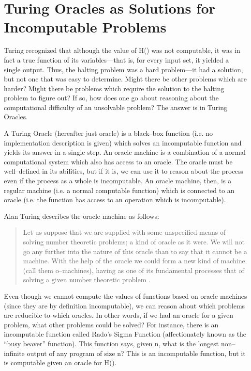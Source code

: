 \section[Turing Oracles as Solutions]{Turing Oracles as Solutions for Incomputable Problems}

Turing recognized that although the value of H() was not computable, it was in fact a true function of its variables---that is, for every input set, it yielded a single output.  Thus, the halting problem was a hard problem---it had a solution, but not one that was easy to determine.  Might there be other problems which are harder?  Might there be problems which require the solution to the halting problem to figure out?  If so, how does one go about reasoning about the computational difficulty of an unsolvable problem?  The answer is in Turing Oracles.  

A Turing Oracle (hereafter just oracle) is a black--box function (i.e. no implementation description is given) which solves an incomputable function and yields its answer in a single step.  An oracle machine is a combination of a normal computational system which also has access to an oracle.  The oracle must be well--defined in its abilities, but if it is, we can use it to reason about the process even if the process as a whole is incomputable.  An oracle machine, then, is a regular machine (i.e. a normal computable function) which is connected to an oracle (i.e. the function has access to an operation which is incomputable).

Alan Turing describes the oracle machine as follows:

\begin{quote}
Let us suppose that we are supplied with some unspecified means of solving number theoretic problems; a kind of oracle as it were.  We will not go any further into the nature of this oracle than to say that it cannot be a machine.  With the help of the oracle we could form a new kind of machine (call them o--machines), having as one of its fundamental processes that of solving a given number theoretic problem \citep{turing1939}.
\end{quote}

Even though we cannot compute the values of functions based on oracle machines (since they are by definition incomputable), we can reason about which problems are reducible to which oracles.  In other words, if we had an oracle for a given problem, what other problems could be solved?  For instance, there is an incomputable function called Rado's Sigma Function (affectionately known as the ``busy beaver'' function).  This function says, given n, what is the longest non--infinite output of any program of size n?  This is an incomputable function, but it is computable given an oracle for H().

